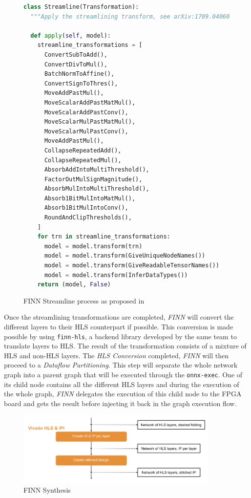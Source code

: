 \begin{figure}[htbp]
\centering
\begin{lstlisting}[language=Python]
class Streamline(Transformation):
  """Apply the streamlining transform, see arXiv:1709.04060."""

  def apply(self, model):
    streamline_transformations = [
      ConvertSubToAdd(),
      ConvertDivToMul(),
      BatchNormToAffine(),
      ConvertSignToThres(),
      MoveAddPastMul(),
      MoveScalarAddPastMatMul(),
      MoveScalarAddPastConv(),
      MoveScalarMulPastMatMul(),
      MoveScalarMulPastConv(),
      MoveAddPastMul(),
      CollapseRepeatedAdd(),
      CollapseRepeatedMul(),
      AbsorbAddIntoMultiThreshold(),
      FactorOutMulSignMagnitude(),
      AbsorbMulIntoMultiThreshold(),
      Absorb1BitMulIntoMatMul(),
      Absorb1BitMulIntoConv(),
      RoundAndClipThresholds(),
    ]
    for trn in streamline_transformations:
      model = model.transform(trn)
      model = model.transform(GiveUniqueNodeNames())
      model = model.transform(GiveReadableTensorNames())
      model = model.transform(InferDataTypes())
    return (model, False)
\end{lstlisting}
\caption[FINN Streamline]{FINN Streamline process as proposed in }
	\label{fig:FINNStreamline}
\end{figure}


Once the streamlining transformations are completed, \emph{FINN} will convert the different layers to their HLS counterpart if possible. This conversion is made possible by using \texttt{finn-hls}, a backend library developed by the same team to translate layers to HLS. The result of the transformation consists of a mixture of HLS and non-HLS layers. The \emph{HLS Conversion} completed, \emph{FINN} will then proceed to a \emph{Dataflow Partitioning}. This step will separate the whole network graph into a parent graph that will be executed through the \texttt{onnx-exec}. One of its child node contains all the different HLS layers and during the execution of the whole graph, \emph{FINN} delegates the execution of this child node to the FPGA board and gets the result before injecting it back in the graph execution flow.

\begin{figure}[htbp]
	\centering
		\includegraphics[width=10cm]{Figures/FINNSynthesis.png}
	\caption[FINN Synthesis]{FINN Synthesis}
	\label{fig:FINNSynthesis}
\end{figure}

